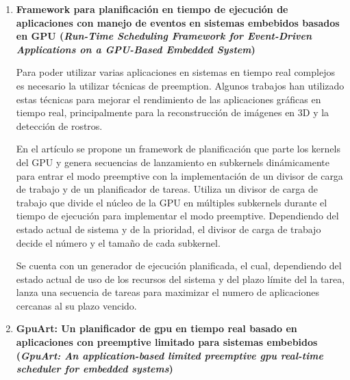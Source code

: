\begin{enumerate}
\item \textbf{Framework para planificación en tiempo de ejecución de aplicaciones con manejo de eventos en sistemas embebidos basados en GPU 
	(\textit{Run-Time Scheduling Framework for Event-Driven Applications on a GPU-Based Embedded System})}
	
	Para poder utilizar varias aplicaciones en sistemas en tiempo real complejos es necesario la utilizar técnicas de preemption. Algunos trabajos han utilizado estas técnicas para mejorar el rendimiento de las aplicaciones gráficas en tiempo real, principalmente para la reconstrucción de imágenes en 3D y la detección de rostros.

\vspace{0.3cm}

En el artículo \cite{RTFG} se propone un framework de planificación que parte los kernels del GPU y genera secuencias de lanzamiento en subkernels dinámicamente para entrar el modo preemptive con la implementación de un divisor de carga de trabajo y de un planificador de tareas. Utiliza un divisor de carga de trabajo que divide el núcleo de la GPU en múltiples subkernels durante el tiempo de ejecución para implementar el modo preemptive. Dependiendo del estado actual de sistema y de la prioridad, el divisor de carga de trabajo decide el número y el tamaño de cada subkernel. 

\vspace{0.3cm}

Se cuenta con un generador de ejecución planificada, el cual, dependiendo del estado actual de uso de los recursos del sistema y del plazo límite del la tarea, lanza una secuencia de tareas para maximizar el numero de aplicaciones cercanas al su plazo vencido.	
	
\item \textbf{GpuArt: Un planificador de gpu en tiempo real basado en aplicaciones con preemptive limitado para sistemas embebidos
	(\textit{GpuArt: An application-based limited preemptive gpu real-time scheduler for embedded systems})}
\end{enumerate}  	

